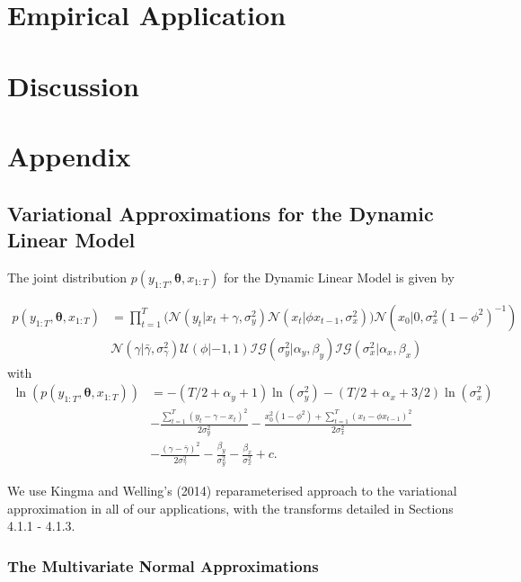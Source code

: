 \documentclass[12pt,a4paper]{article}%
\numberwithin{equation}{section}
\begin{document}
{{{{{{\section{Empirical Application}

\section{Discussion}


\newpage
\section{Appendix}
\iffalse %

\subsection{Variational Approximations for the Dynamic Linear Model}

The joint distribution $p(y_{1:T}, \boldsymbol{\theta}, x_{1:T})$ for the Dynamic Linear Model is given by

\begin{align}
p(y_{1:T}, \boldsymbol{\theta}, x_{1:T}) &= \prod_{t=1}^{T} \bigg( \mathcal{N}(y_t | x_t + \gamma, \sigma^2_y) \mathcal{N}(x_t | \phi x_{t-1}, \sigma^2_x) \bigg) \mathcal{N}(x_0 | 0, \sigma^2_x (1 - \phi^2)^{-1}) \nonumber \\
&\mathcal{N}(\gamma | \bar{\gamma}, \sigma^2_{\gamma}) \mathcal{U}(\phi | -1, 1) \mathcal{IG}(\sigma^2_y | \alpha_y, \beta_y)\mathcal{IG}(\sigma^2_x | \alpha_x, \beta_x) 
\end{align}
with 
\begin{align}
\ln(p(y_{1:T}, \boldsymbol{\theta}, x_{1:T})) &= -(T/2 + \alpha_y + 1) \ln(\sigma_y^2) -(T/2 + \alpha_x + 3/2) \ln(\sigma_x^2) \nonumber \\
&- \frac{\sum_{t=1}^{T}(y_t - \gamma - x_t)^2}{2 \sigma^2_y} - \frac{x_0^2(1 -\phi^2) + \sum_{t=1}^{T}(x_t - \phi x_{t-1})^2}{2 \sigma^2_x} \nonumber \\
&- \frac{(\gamma - \bar{\gamma})^2}{2 \sigma^2_{\gamma}} - \frac{\beta_y}{\sigma^2_y} - \frac{\beta_x}{\sigma^2_x} + c \label{logjoint}. 
\end{align}

We use Kingma and Welling's (2014) reparameterised approach to the variational approximation in all of our applications, with the transforms detailed in Sections 4.1.1 - 4.1.3.

\subsubsection{The Multivariate Normal Approximations}

}}}}}}
\end{document}
